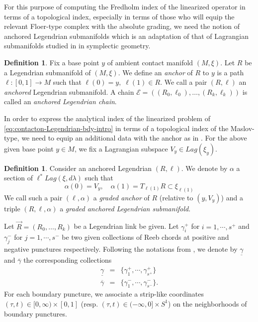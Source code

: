 \documentclass[reqno]{amsart}
\newcommand{\beastar}{\begin{eqnarray*}}
\newcommand{\eeastar}{\end{eqnarray*}}
\theoremstyle{theorem}
\theoremstyle{definition}
\newtheorem{defn}[thm]{Definition}
\numberwithin{equation}{section}
\begin{document}
For this purpose of computing the Fredholm index of the linearized operator in terms of a topological index, especially in terms of those who will equip the relevant Floer-type
complex with the absolute grading, we need  the notion of anchored Legendrian
submanifolds which is an adaptation of that of Lagrangian submanifolds studied in \cite{fooo:anchored}
in symplectic geometry.
\begin{defn}\label{defn:anchor-intro}
Fix a base point $y$ of ambient contact manifold $(M,\xi)$. Let $R$ be a Legendrian submanifold of $(M,\xi)$. We define an
\emph{anchor} of $R$ to $y$ is a path $\ell:[0,1] \rightarrow M$ such that $\ell(0)=y,\;\ell(1)\in R$. We call a pair $(R,\ell)$
an \emph{anchored} Legendrian submanifold.
A chain $\mathcal{E} = ((R_0,\ell_0),\ldots,(R_k,\ell_k))$ is called an \emph{anchored Legendrian chain}.
\end{defn}

In order to express the analytical index of the linearized problem of \eqref{eq:contacton-Legendrian-bdy-intro}
in terms of a topological index of the Maslov-type, we need to equip an additional data with the anchor as in \cite{fooo:anchored}.
For the above given base point $y\in M$, we fix a Lagrangian subspace $V_y\in Lag(\xi_y)$.

\begin{defn}
Consider an anchored Legendrian $(R,\ell)$. We denote by $\alpha$ a section of $\ell^*Lag(\xi,d\lambda)$ such that
$$
\alpha(0)=V_y, \quad \alpha(1)=T_{\ell(1)}R \subset \xi_{\ell(1)}
$$
We call such a pair $(\ell,\alpha)$ a \emph{graded anchor} of $R$ (relative to $(y,V_y)$) and a triple $(R,\ell,\alpha)$
a \emph{graded anchored Legendrian submanifold}.
\end{defn}

Let $\vec R = (R_0, \ldots, R_k)$ be a Legendrian link be given.
Let $\gamma^+_i$ for $i =1, \cdots, s^+$ and $\gamma^-_j$ for $j = 1, \cdots, s^-$
be two given collections of Reeb chords at positive and negative punctures
respectively. Following the notations from \cite{behwz},
we denote by $\underline \gamma$ and $\overline \gamma$ the corresponding
collections
\beastar
\underline \gamma & = & \{\gamma_1^+,\cdots, \gamma^+_{s^+}\} \\
\overline \gamma & = & \{\gamma_1^-,\cdots, \gamma^-_{s^-}\}.
\eeastar
For each boundary puncture, we associate a strip-like
coordinates $(\tau,t) \in [0,\infty) \times [0,1]$ (resp. $(\tau,t) \in (-\infty,0] \times S^1$)
on the neighborhoods of boundary punctures.
\end{document}
